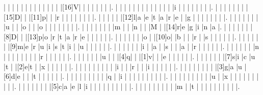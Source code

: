 \documentclass[12pt]{article}
\begin{document}
\begin{Puzzle}{22}{24}
  |{}  |{}  |{}  |{}  |{}  |{}  |{}  |{}  |{}  |{}  |{}  |{}  |{}  |[16]V|{}  |{}  |{}  |{}  |{}  |{}  |{}  |.
  |{}  |{}  |{}  |{}  |{}  |{}  |{}  |{}  |{}  |{}  |{}  |{}  |{}  |i   |{}  |{}  |{}  |{}  |{}  |{}  |{}  |.
  |{}  |{}  |{}  |{}  |{}  |{}  |{}  |[15]D|{}  |{}  |[11]p|{}  |{}  |r   |{}  |{}  |{}  |{}  |{}  |{}  |{}  |.
  |{}  |{}  |{}  |{}  |{}  |[12]l|a   |e   |t   |a   |r   |e   |{}  |g   |{}  |{}  |{}  |{}  |{}  |{}  |{}  |.
  |{}  |{}  |{}  |{}  |{}  |{}  |{}  |u   |{}  |{}  |o   |{}  |{}  |o   |{}  |{}  |{}  |{}  |{}  |{}  |{}  |.
  |{}  |{}  |{}  |{}  |{}  |{}  |{}  |m   |{}  |{}  |n   |{}  |{}  |M   |{}  |[14]r|e   |g   |i   |n   |a   |.
  |{}  |{}  |{}  |{}  |{}  |{}  |[8]D|{}  |{}  |[13]p|o   |r   |t   |a   |r   |e   |{}  |{}  |{}  |{}  |{}  |.
  |{}  |{}  |{}  |{}  |{}  |{}  |o   |{}  |[10]o|{}  |b   |{}  |{}  |r   |{}  |s   |{}  |{}  |{}  |{}  |{}  |.
  |{}  |{}  |{}  |{}  |{}  |{}  |[9]m|e   |r   |u   |i   |s   |t   |i   |{}  |u   |{}  |{}  |{}  |{}  |{}  |.
  |{}  |{}  |{}  |{}  |{}  |{}  |i   |{}  |a   |{}  |s   |{}  |{}  |a   |{}  |r   |{}  |{}  |{}  |{}  |{}  |.
  |{}  |{}  |{}  |{}  |{}  |{}  |n   |{}  |{}  |{}  |{}  |{}  |{}  |{}  |{}  |r   |{}  |{}  |{}  |{}  |{}  |.
  |{}  |{}  |{}  |{}  |{}  |{}  |u   |{}  |{}  |[4]q|{}  |{}  |[1]v|{}  |{}  |e   |{}  |{}  |{}  |{}  |{}  |.
  |{}  |{}  |{}  |{}  |{}  |{}  |[7]s|i   |c   |u   |t   |{}  |[2]e|t   |{}  |x   |{}  |{}  |{}  |{}  |{}  |.
  |{}  |{}  |{}  |{}  |{}  |{}  |{}  |{}  |{}  |i   |{}  |{}  |r   |{}  |{}  |i   |{}  |{}  |{}  |{}  |{}  |.
  |{}  |{}  |{}  |{}  |{}  |{}  |{}  |{}  |[3]g|a   |u   |[6]d|e   |{}  |{}  |t   |{}  |{}  |{}  |{}  |{}  |.
  |{}  |{}  |{}  |{}  |{}  |{}  |{}  |{}  |{}  |q   |{}  |i   |{}  |{}  |{}  |{}  |{}  |{}  |{}  |{}  |{}  |.
  |{}  |{}  |{}  |{}  |{}  |{}  |{}  |{}  |{}  |u   |{}  |x   |{}  |{}  |{}  |{}  |{}  |{}  |{}  |{}  |{}  |.
  |{}  |{}  |{}  |{}  |{}  |{}  |{}  |[5]c|a   |e   |l   |i   |{}  |{}  |{}  |{}  |{}  |{}  |{}  |{}  |{}  |.
  |{}  |{}  |{}  |{}  |{}  |{}  |{}  |{}  |{}  |m   |{}  |t   |{}  |{}  |{}  |{}  |{}  |{}  |{}  |{}  |{}  |.
\end{Puzzle}
\end{document}
